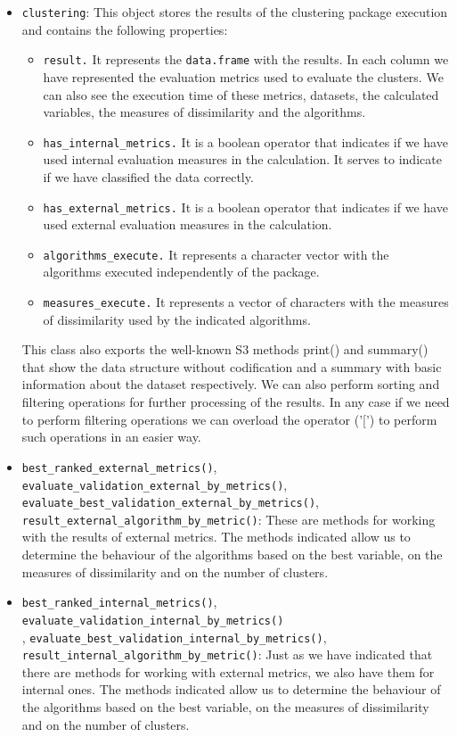 \begin{itemize}
    \item \texttt{clustering}: This object stores the results of the clustering package execution and contains the following properties:
    \begin{itemize}
        \item \texttt{result.} It represents the \texttt{data.frame} with the results. In each column we have represented the evaluation metrics used to evaluate the clusters. We can also see the execution time of these metrics, datasets, the calculated variables, the measures of dissimilarity and the algorithms.
        \item \texttt{has\_internal\_metrics.} It is a boolean operator that indicates if we have used internal evaluation measures in the calculation. It serves to indicate if we have classified the data correctly.
        \item \texttt{has\_external\_metrics.} It is a boolean operator that indicates if we have used external evaluation measures in the calculation.
        \item \texttt{algorithms\_execute.} It represents a character vector with the algorithms executed independently of the package.
        \item \texttt{measures\_execute.} It represents a vector of characters with the measures of dissimilarity used by the indicated algorithms.
    \end{itemize}
    This class also exports the well-known S3 methods print() and summary() that show the data
structure without codification and a summary with basic information about the dataset respectively. We can also perform sorting and filtering operations for further processing of the results. In any case if we need to perform filtering operations we can overload the operator ('[') to perform such operations in an easier way.
    \item \texttt{best\_ranked\_external\_metrics()}, \texttt{evaluate\_validation\_external\_by\_metrics()},\\ \texttt{evaluate\_best\_validation\_external\_by\_metrics()},\\ \texttt{result\_external\_algorithm\_by\_metric()}:
    These are methods for working with the results of external metrics. The methods indicated allow us to determine the behaviour of the algorithms based on the best variable, on the measures of dissimilarity and on the number of clusters.

    \item \texttt{best\_ranked\_internal\_metrics()}, \texttt{evaluate\_validation\_internal\_by\_metrics()}\\, \texttt{evaluate\_best\_validation\_internal\_by\_metrics()},\\ \texttt{result\_internal\_algorithm\_by\_metric()}: Just as we have indicated that there are methods for working with external metrics, we also have them for internal ones. The methods indicated allow us to determine the behaviour of the algorithms based on the best variable, on the measures of dissimilarity and on the number of clusters.
\end{itemize}
